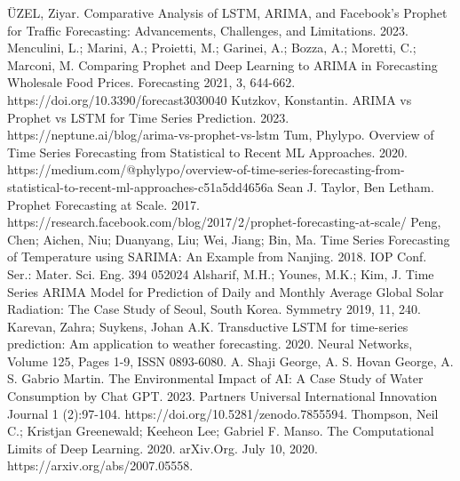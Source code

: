 \documentclass[french]{article}
\begin{document}
    \newpage
    \begin{thebibliography}{5}
         ÜZEL, Ziyar. Comparative Analysis of LSTM, ARIMA, and Facebook’s Prophet for Traffic Forecasting: Advancements, Challenges, and Limitations. 2023. 
         Menculini, L.; Marini, A.; Proietti, M.; Garinei, A.; Bozza, A.; Moretti, C.; Marconi, M. Comparing Prophet and Deep Learning to ARIMA in Forecasting Wholesale Food Prices. Forecasting 2021, 3, 644-662. https://doi.org/10.3390/forecast3030040
         Kutzkov, Konstantin. ARIMA vs Prophet vs LSTM for Time Series Prediction. 2023. https://neptune.ai/blog/arima-vs-prophet-vs-lstm
         Tum, Phylypo. Overview of Time Series Forecasting from Statistical to Recent ML Approaches. 2020. https://medium.com/@phylypo/overview-of-time-series-forecasting-from-statistical-to-recent-ml-approaches-c51a5dd4656a
         Sean J. Taylor, Ben Letham. Prophet Forecasting at Scale. 2017. https://research.facebook.com/blog/2017/2/prophet-forecasting-at-scale/
         Peng, Chen; Aichen, Niu; Duanyang, Liu; Wei, Jiang; Bin, Ma. Time Series Forecasting of Temperature using SARIMA: An Example from Nanjing. 2018. IOP Conf. Ser.: Mater. Sci. Eng. 394 052024
         Alsharif, M.H.; Younes, M.K.; Kim, J. Time Series ARIMA Model for Prediction of Daily and Monthly Average Global Solar Radiation: The Case Study of Seoul, South Korea. Symmetry 2019, 11, 240.
         Karevan, Zahra; Suykens, Johan A.K. Transductive LSTM for time-series prediction: Am application to weather forecasting. 2020. Neural Networks, Volume 125, Pages 1-9, ISSN 0893-6080.
         A. Shaji George, A. S. Hovan George, A. S. Gabrio Martin. The Environmental Impact of AI: A Case Study of Water Consumption by Chat GPT. 2023. Partners Universal International Innovation Journal 1 (2):97-104. https://doi.org/10.5281/zenodo.7855594.
         Thompson, Neil C.; Kristjan Greenewald; Keeheon Lee; Gabriel F. Manso. The Computational Limits of Deep Learning. 2020. arXiv.Org. July 10, 2020. https://arxiv.org/abs/2007.05558.
    \end{thebibliography}
    \label{sec:references}

    
\end{document}
